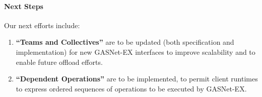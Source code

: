 \paragraph{Next Steps}

Our next efforts include:
\begin{enumerate}

\item \textbf{``Teams and Collectives''} are to be updated (both specification
and implementation) for new GASNet-EX interfaces to improve scalability and to
enable future offload efforts.

\item \textbf{``Dependent Operations''} are to be implemented, to permit client
runtimes to express ordered sequences of operations to be executed by GASNet-EX.

\end{enumerate}
